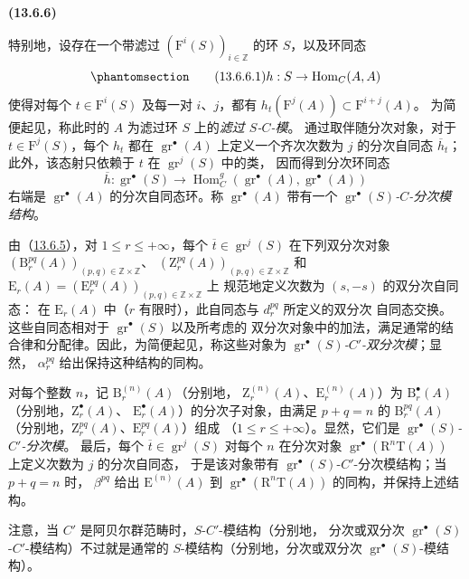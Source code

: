 \documentclass[UTF8,fontset=none,11pt,oneside,openany]{ctexbook}
\newenvironment{env}[1][]{%
  \par\medskip\noindent\textbf{(#1)}\ %
}{\par}
\newcommand{\oldpage}[2][]{%
  \hypertarget{ega-source-page-#1-#2}{}%
  \marginnote{\scriptsize\textbf{#1}~|~#2}\ignorespaces}
\let\EGAOriginalLabel\label
\renewcommand{\label}[1]{\phantomsection\EGAOriginalLabel{#1}}
\begin{document}
\begin{env}[13.6.6]
\label{0.13.6.6-fr}
特别地，设存在一个带滤过
$(\mathrm F^i(S))_{i\in\mathbb Z}$ 的环 $S$，以及环同态
\begin{equation}
\label{0.13.6.6.1-fr}
\tag{13.6.6.1}
h:S\to\operatorname{Hom}_C(A,A)
\end{equation}
\oldpage[0\textsubscript{III}]{75}
使得对每个 $t\in\mathrm F^i(S)$ 及每一对 $i$、$j$，都有
$h_t(\mathrm F^j(A))\subset\mathrm F^{i+j}(A)$。
为简便起见，称此时的 $A$ 为滤过环 $S$ 上的\emph{滤过 $S$-$C$-模}。
通过取伴随分次对象，对于 $t\in\mathrm F^j(S)$，每个 $h_t$ 都在
$\operatorname{gr}^\bullet(A)$ 上定义一个齐次次数为 $j$ 的分次自同态
$\overline h_t$；此外，该态射只依赖于 $t$ 在 $\operatorname{gr}^j(S)$ 中的类，
因而得到分次环同态
\[
\overline h:\operatorname{gr}^\bullet(S)\to
\operatorname{Hom}_C^g(\operatorname{gr}^\bullet(A),
\operatorname{gr}^\bullet(A))
\]
右端是 $\operatorname{gr}^\bullet(A)$ 的分次自同态环。称
$\operatorname{gr}^\bullet(A)$ 带有一个
\emph{$\operatorname{gr}^\bullet(S)$-$C$-分次模结构}。

由（\hyperref[0.13.6.5-fr]{13.6.5}），对 $1\leq r\leq+\infty$，每个
$\overline t\in\operatorname{gr}^j(S)$ 在下列双分次对象
$(\mathrm B_r^{pq}(A))_{(p,q)\in\mathbb Z\times\mathbb Z}$、
$(\mathrm Z_r^{pq}(A))_{(p,q)\in\mathbb Z\times\mathbb Z}$ 和
$\mathrm E_r(A)=(\mathrm E_r^{pq}(A))_{(p,q)\in\mathbb Z\times\mathbb Z}$ 上
规范地定义次数为 $(s,-s)$ 的双分次自同态：
在 $\mathrm E_r(A)$ 中（$r$ 有限时），此自同态与 $d_r^{pq}$ 所定义的双分次
自同态交换。这些自同态相对于 $\operatorname{gr}^\bullet(S)$ 以及所考虑的
双分次对象中的加法，满足通常的结合律和分配律。因此，为简便起见，称这些对象为
\emph{$\operatorname{gr}^\bullet(S)$-$C'$-双分次模}；显然，
$\alpha_r^{pq}$ 给出保持这种结构的同构。

对每个整数 $n$，记 $\mathrm B_r^{(n)}(A)$（分别地，
$\mathrm Z_r^{(n)}(A)$、$\mathrm E_r^{(n)}(A)$）为
$\mathrm B_r^\bullet(A)$（分别地，$\mathrm Z_r^\bullet(A)$、
$\mathrm E_r^\bullet(A)$）的分次子对象，由满足 $p+q=n$ 的
$\mathrm B_r^{pq}(A)$（分别地，$\mathrm Z_r^{pq}(A)$、$\mathrm E_r^{pq}(A)$）组成
（$1\leq r\leq+\infty$）。显然，它们是
\emph{$\operatorname{gr}^\bullet(S)$-$C'$-分次模}。
最后，每个 $\overline t\in\operatorname{gr}^j(S)$ 对每个 $n$ 在分次对象
$\operatorname{gr}^\bullet(\mathrm R^n\mathrm T(A))$ 上定义次数为 $j$ 的分次自同态，
于是该对象带有 $\operatorname{gr}^\bullet(S)$-$C'$-分次模结构；当 $p+q=n$ 时，
$\beta^{pq}$ 给出
$\mathrm E^{(n)}(A)$ 到
$\operatorname{gr}^\bullet(\mathrm R^n\mathrm T(A))$ 的同构，并保持上述结构。

注意，当 $C'$ 是阿贝尔群范畴时，$S$-$C'$-模结构（分别地，
分次或双分次 $\operatorname{gr}^\bullet(S)$-$C'$-模结构）不过就是通常的
$S$-模结构（分别地，分次或双分次 $\operatorname{gr}^\bullet(S)$-模结构）。
\end{env}
\end{document}
